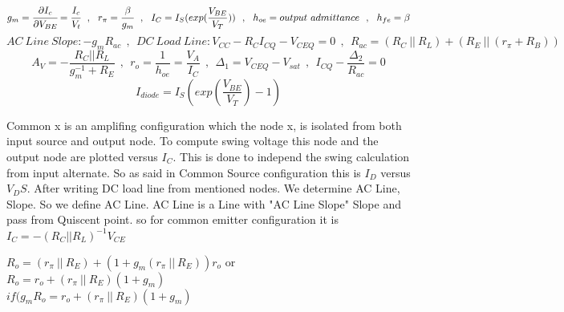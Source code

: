 $$ g_m = \cfrac{\partial I_c}{\partial V_{BE}} = \cfrac{I_c}{V_t} ~~,~~ r_\pi = \cfrac{\beta}{g_m} ~~ , ~~ I_C = I_S ( exp (\dfrac{V_{BE}}{V_T}))~~ , ~~ h_{oe} = output~admittance ~~ , ~~ h_{fe} = \beta $$
$$AC~Line~Slope:  -g_m R_{ac}  ~~ , ~~ DC~Load~Line :  V_{CC} - R_C I_{CQ} - V_{CEQ} = 0 ~~ , ~~ R_{ac} = ( R_C ~ || ~ R_L ) + ( R_E~ || ~ ( r_{\pi} + R_B ) ) $$
$$ A_V = -\dfrac{R_C || R_L}{g_m^{-1} + R_E} ~~ , ~~ r_o = \frac{1}{h_{oe}} = \frac{V_A}{I_C} ~~ , ~~ {\Delta}_1 = V_{CEQ} - V_{sat} ~~ , ~~ I_{CQ} - \frac{{\Delta}_2}{R_{ac}} = 0 $$
$$ I_{diode} = I_S ( exp (\dfrac{V_{BE}}{V_T}) - 1) $$
\setlength{\parindent}{0.5cm} %
\par
Common x is an amplifing configuration which the node x, is isolated from both input source and output node. To compute swing voltage this node and the output node are plotted versus $I_C$. This is done to independ the swing calculation from input alternate. So as said in Common Source configuration this is $I_D$ versus $V_DS$. After writing DC load line from mentioned nodes. We determine AC Line, Slope. So we define AC Line. AC Line is a Line with "AC Line Slope" Slope and pass from Quiscent point. so for common emitter configuration it is $ I_C = - ( R_C || R_L )^{-1} V_{CE} $
\lipsum[1]
\setlength{\parindent}{0.0cm} 
\begin{minipage}[b]{.5\textwidth}
$ R_o = (r_\pi ~||~ R_E) + ( 1 + g_m (r_\pi ~||~ R_E) )r_o$ or \\
$ R_o = r_o + (r_\pi ~||~ R_E)( 1 + g_m  )$ \\
$ if ( g_m R_o = r_o + (r_\pi ~||~ R_E)( 1 + g_m  )$ \\
\par 

\\
\end{minipage}%
